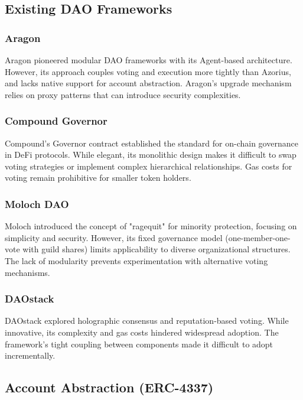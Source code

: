 \documentclass[11pt,a4paper]{article}
\begin{document}
\subsection{Existing DAO Frameworks}

\subsubsection{Aragon}

Aragon \cite{aragon} pioneered modular DAO frameworks with its Agent-based architecture. However, its approach couples voting and execution more tightly than Azorius, and lacks native support for account abstraction. Aragon's upgrade mechanism relies on proxy patterns that can introduce security complexities.

\subsubsection{Compound Governor}

Compound's Governor contract \cite{compound} established the standard for on-chain governance in DeFi protocols. While elegant, its monolithic design makes it difficult to swap voting strategies or implement complex hierarchical relationships. Gas costs for voting remain prohibitive for smaller token holders.

\subsubsection{Moloch DAO}

Moloch \cite{moloch} introduced the concept of "ragequit" for minority protection, focusing on simplicity and security. However, its fixed governance model (one-member-one-vote with guild shares) limits applicability to diverse organizational structures. The lack of modularity prevents experimentation with alternative voting mechanisms.

\subsubsection{DAOstack}

DAOstack \cite{daostack} explored holographic consensus and reputation-based voting. While innovative, its complexity and gas costs hindered widespread adoption. The framework's tight coupling between components made it difficult to adopt incrementally.

\subsection{Account Abstraction (ERC-4337)}
\end{document}
